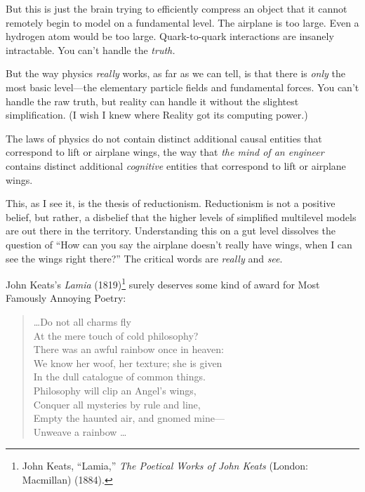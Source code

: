 {
 But this is just the brain trying to efficiently compress an
object that it cannot remotely begin to model on a fundamental level.
The airplane is too large. Even a hydrogen atom would be too large.
Quark-to-quark interactions are insanely intractable. You
can't handle the \textit{truth.}}

{
 But the way physics \textit{really} works, as far as we can tell,
is that there is \textit{only} the most basic level---the elementary
particle fields and fundamental forces. You can't
handle the raw truth, but reality can handle it without the slightest
simplification. (I wish I knew where Reality got its computing power.)}

{
 The laws of physics do not contain distinct additional causal
entities that correspond to lift or airplane wings, the way that
\textit{the mind of an engineer} contains distinct additional
\textit{cognitive} entities that correspond to lift or airplane wings.}

{
 This, as I see it, is the thesis of reductionism. Reductionism is
not a positive belief, but rather, a disbelief that the higher levels
of simplified multilevel models are out there in the territory.
Understanding this on a gut level dissolves the question of
``How can you say the airplane doesn't
really have wings, when I can see the wings right
there?'' The critical words are \textit{really} and
\textit{see}.}

\myendsectiontext


{
 John Keats's \textit{Lamia}
(1819)\footnote{John Keats, ``Lamia,''
\textit{The Poetical Works of John Keats} (London: Macmillan) (1884).} surely deserves some kind of award for Most
Famously Annoying Poetry:}

\begin{verse}
 \ldots Do not all charms fly \\
 At the mere touch of cold philosophy?\\
 There was an awful rainbow once in heaven: \\
 We know her woof, her texture; she is given \\
 In the dull catalogue of common things. \\
 Philosophy will clip an Angel's wings, \\
 Conquer all mysteries by rule and line, \\
 Empty the haunted air, and gnomed mine--- \\
 Unweave a rainbow \ldots \\
\end{verse}

